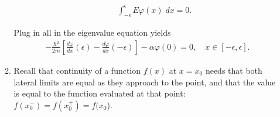 \documentclass[letterpaper,11pt,twoside]{article}
\begin{document}
\begin{enumerate}[itemsep=0pt,topsep=0pt,label=(\alph*)]
\begin{enumerate}[itemsep=0pt,topsep=0pt,label=(a.\arabic*)]
\begin{itemize}
      \begin{align}
        \int_{-\epsilon}^\epsilon E\varphi(x)\;dx=0.
      \end{align}
    \end{itemize}
    Plug in all in the eigenvalue equation yields
    \begin{align}
      -\frac{\hbar^2}{2m}\left[\frac{d\varphi}{dx}(\epsilon)
        -\frac{d\varphi}{dx}(-\epsilon)\right]-\alpha\varphi(0)=0,\quad x\in[-\epsilon,\epsilon].
        \label{eq:inteigenvalueequation}
    \end{align}
    \item Recall that continuity of a function $f(x)$ at $x=x_0$ needs that both lateral limits are equal as they approach to the point, 
    and that the value is equal to the function evaluated at that point: $f(x_0^-)=f(x_0^+)=f(x_0$).


\end{enumerate}
\end{enumerate}
\end{document}
